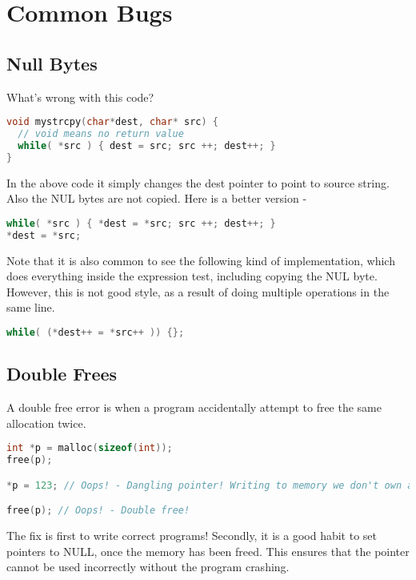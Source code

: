 \section{Common Bugs}

\subsection{Null Bytes}

What's wrong with this code?

\begin{lstlisting}[language=C]
void mystrcpy(char*dest, char* src) {
  // void means no return value
  while( *src ) { dest = src; src ++; dest++; }
}
\end{lstlisting}

In the above code it simply changes the dest pointer to point to source string.
Also the NUL bytes are not copied.
Here is a better version -

\begin{lstlisting}[language=C]
while( *src ) { *dest = *src; src ++; dest++; }
*dest = *src;
\end{lstlisting}

Note that it is also common to see the following kind of implementation, which does everything inside the expression test, including copying the NUL byte.
However, this is not good style, as a result of doing multiple operations in the same line.

\begin{lstlisting}[language=C]
while( (*dest++ = *src++ )) {};
\end{lstlisting}

\subsection{Double Frees}

A double free error is when a program accidentally attempt to free the same allocation twice.

\begin{lstlisting}[language=C]
int *p = malloc(sizeof(int));
free(p);

*p = 123; // Oops! - Dangling pointer! Writing to memory we don't own anymore

free(p); // Oops! - Double free!
\end{lstlisting}

The fix is first to write correct programs!
Secondly, it is a good habit to set pointers to NULL, once the memory has been freed.
This ensures that the pointer cannot be used incorrectly without the program crashing.

